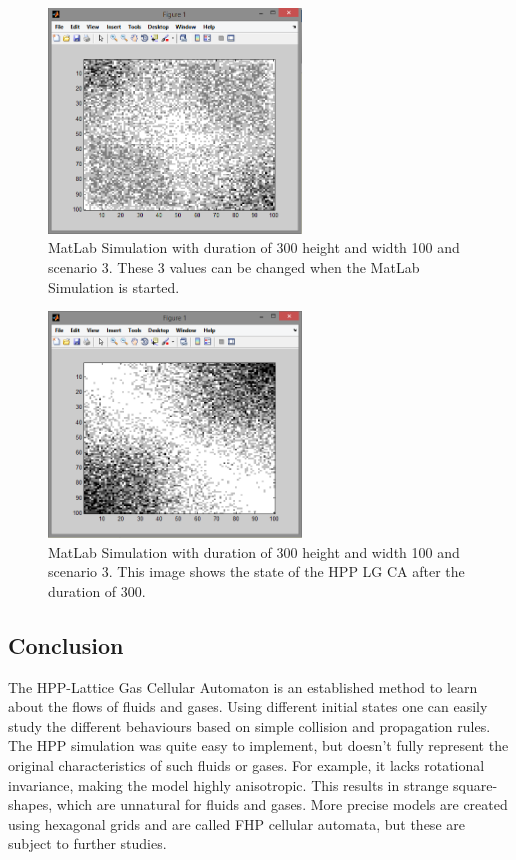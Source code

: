 \documentclass[paper=a4, fontsize=11pt]{scrartcl} %
\numberwithin{equation}{section} %
\numberwithin{figure}{section} %
\numberwithin{table}{section} %
\begin{document}
\begin{figure}[H]
	\centering
		\includegraphics[width=0.60\textwidth]{Screenshots/MatLab-300-100-100-3-Start.PNG}
	\caption[MatLab Example 1 - Start]{MatLab Simulation with duration of 300 height and width 100 and scenario 3. These 3 values can be changed when the MatLab Simulation is started.}
	\label{fig:matlab-example1-start}
\end{figure}

\begin{figure}[H]
	\centering
		\includegraphics[width=0.60\textwidth]{Screenshots/MatLab-300-100-100-3-End.PNG}
	\caption[MatLab Example 1 - End]{MatLab Simulation with duration of 300 height and width 100 and scenario 3. This image shows the state of the HPP LG CA after the duration of 300.}
	\label{fig:matlab-example1-end}
\end{figure}

\subsection{Conclusion}
The HPP-Lattice Gas Cellular Automaton is an established method to learn about the flows of fluids and gases. 
Using different initial states one can easily study the different behaviours based on simple collision and propagation rules.
The HPP simulation was quite easy to implement, but doesn't fully represent the original characteristics of such fluids or gases. 
For example, it lacks rotational invariance, making the model highly anisotropic. 
This results in strange square-shapes, which are unnatural for fluids and gases.
More precise models are created using hexagonal grids and are called FHP cellular automata, but these are subject to further studies.
\end{document}

